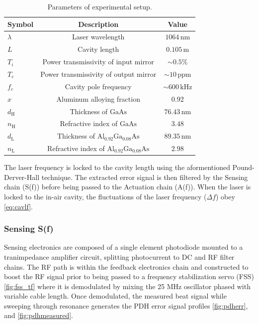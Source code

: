 \begin{table}[h!]
\caption{Parameters of experimental setup.}
\centering 
\begin{tabular}{lcc}
    \hline \hline
    Symbol & Description & Value \\
    \hline
    $\lambda$ & Laser wavelength & $1064 \, \mathrm{nm}$ \\
    $L$ & Cavity length & $0.105\, \mathrm{m}$ \\
    $T_i$ & Power transmissivity of input mirror & $\sim0.5\%$ \\
    $T_e$ & Power transmissivity of output mirror & $\sim10\, \mathrm{ppm}$ \\
    $f_c$ & Cavity pole frequency & $\sim600\, \mathrm{kHz}$ \\
    $x$ & Aluminum alloying fraction & 0.92 \\
    $d_{\mathrm{H}}$ & Thickness of $\mathrm{GaAs}$ & $76.43\, \mathrm{nm}$ \\
    $n_{\mathrm{H}}$ & Refractive index of $\mathrm{GaAs}$ & $3.48$ \\
    $d_{\mathrm{L}}$ & Thickness of $\mathrm{Al_{0.92}Ga_{0.08}As}$ & $89.35\, \mathrm{nm}$ \\
    $n_{\mathrm{L}}$ & Refractive index of $\mathrm{Al_{0.92}Ga_{0.08}As}$ & $2.98$ \\
    \hline \hline
\end{tabular} \label{table:cav_params}
\end{table}

The laser frequency is locked to the cavity length using the aformentioned Pound-Derver-Hall technique. The extracted error signal is then filtered by the Sensing chain (S(f)) before being passed to the Actuation chain (A(f)). When the laser is locked to the in-air cavity, the fluctuations of the laser frequency ($\Delta f$) obey \autoref{eq:cavlf}. 

\subsubsection{Sensing S(f)}
Sensing electronics are composed of a single element photodiode mounted to a tranimpedance amplifier circuit, splitting photocurrent to DC and RF filter chains. The RF path is within the feedback electronics chain and constructed to boost the RF signal prior to being passed to a frequency stabilization servo (FSS) \autoref{fig:fss_tf} where it is demodulated by mixing the 25 MHz oscillator phased with variable cable length. Once demodulated, the measured beat signal while sweeping through resonance generates the PDH error signal profiles \autoref{fig:pdherr}, and \autoref{fig:pdhmeasured}.

